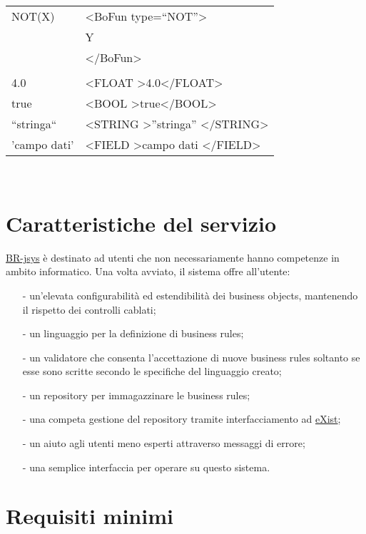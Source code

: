 \begin{table}[htbp]
\begin{tabular}{||p{3cm}||p{6.5cm}||}
\hline
NOT(X) & \textless BoFun type=``NOT''\textgreater \\
&  Y \\
& \textless /BoFun\textgreater \\ \hline
& \\ \hline 
4.0 & \textless FLOAT \textgreater4.0\textless /FLOAT\textgreater \\ \hline
true & \textless BOOL \textgreater true\textless /BOOL\textgreater \\ \hline
``stringa`` & \textless STRING \textgreater ''stringa'' \textless /STRING\textgreater \\ \hline
'campo dati' &\textless FIELD \textgreater campo dati \textless /FIELD\textgreater \\ \hline
\end{tabular} \\
\end{table}

\section{Caratteristiche del servizio}
\underline{BR-jsys} \`e destinato ad utenti che non necessariamente hanno competenze in ambito informatico. Una volta avviato, il sistema offre all'utente:
\begin{itemize}
\item[-] un'elevata configurabilit\`a ed estendibilit\`a dei business objects, mantenendo il rispetto dei controlli cablati;
\item[-] un linguaggio per la definizione di business rules;
\item[-] un validatore che consenta l'accettazione di nuove business rules soltanto se esse sono scritte secondo le specifiche del linguaggio creato;
\item[-] un repository per immagazzinare le business rules;
\item[-] una competa gestione del repository tramite interfacciamento ad \underline{eXist};
\item[-] un aiuto agli utenti meno esperti attraverso  messaggi di errore;
\item[-] una semplice interfaccia per operare su questo sistema.
\end{itemize}
\section{Requisiti minimi}
